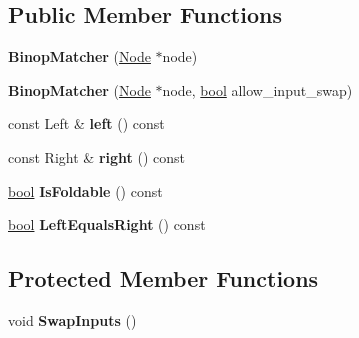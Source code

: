 \subsection*{Public Member Functions}
\begin{DoxyCompactItemize}
\item 
\mbox{\label{structv8_1_1internal_1_1compiler_1_1BinopMatcher_aa9beccff23bb91beb638b797d13b2807}} 
{\bfseries Binop\+Matcher} (\mbox{\hyperlink{classv8_1_1internal_1_1compiler_1_1Node}{Node}} $\ast$node)
\item 
\mbox{\label{structv8_1_1internal_1_1compiler_1_1BinopMatcher_ac8203bbe5394ee8a31d38c7bfb2a13eb}} 
{\bfseries Binop\+Matcher} (\mbox{\hyperlink{classv8_1_1internal_1_1compiler_1_1Node}{Node}} $\ast$node, \mbox{\hyperlink{classbool}{bool}} allow\+\_\+input\+\_\+swap)
\item 
\mbox{\label{structv8_1_1internal_1_1compiler_1_1BinopMatcher_a71d6f3a0da7493aefca751c987f12c26}} 
const Left \& {\bfseries left} () const
\item 
\mbox{\label{structv8_1_1internal_1_1compiler_1_1BinopMatcher_a6b2ea2699a4d9aa2d92c0f1e36950650}} 
const Right \& {\bfseries right} () const
\item 
\mbox{\label{structv8_1_1internal_1_1compiler_1_1BinopMatcher_a282f5b079e8d755c200cba0b9258e76c}} 
\mbox{\hyperlink{classbool}{bool}} {\bfseries Is\+Foldable} () const
\item 
\mbox{\label{structv8_1_1internal_1_1compiler_1_1BinopMatcher_afec81d0388c75d0d46319867503f622a}} 
\mbox{\hyperlink{classbool}{bool}} {\bfseries Left\+Equals\+Right} () const
\end{DoxyCompactItemize}
\subsection*{Protected Member Functions}
\begin{DoxyCompactItemize}
\item 
\mbox{\label{structv8_1_1internal_1_1compiler_1_1BinopMatcher_a64e5dc2c24820c9a364f711d76764c6d}} 
void {\bfseries Swap\+Inputs} ()
\end{DoxyCompactItemize}


